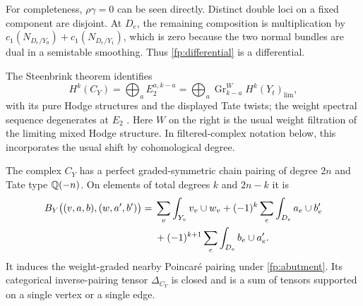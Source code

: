 For completeness, $\rho\gamma=0$ can be seen directly.  Distinct double loci
on a fixed component are disjoint.  At $D_e$, the remaining composition is
multiplication by
$c_1(N_{D_e/Y_0})+c_1(N_{D_e/Y_1})$, which is zero because the two normal
bundles are dual in a semistable smoothing.  Thus \eqref{fp:differential}
is a differential.

The Steenbrink theorem identifies
\begin{equation}\label{fp:abutment}
 H^k(C_Y)=\bigoplus_a E_2^{a,k-a}
 =\bigoplus_a\operatorname{Gr}^{W}_{k-a}H^k(Y_t)_{\mathrm{lim}},
\end{equation}
with its pure Hodge structures and the displayed Tate twists; the weight
spectral sequence degenerates at $E_2$
\cite{Steenbrink1976,Steenbrink1977}.
Here $W$ on the right is the usual weight filtration of the limiting mixed
Hodge structure.  In filtered-complex notation below, this incorporates the
usual shift by cohomological degree.

\begin{lemma}\label{fp:pairing}
The complex $C_Y$ has a perfect graded-symmetric chain pairing of degree $2n$
and Tate type $\mathbb Q(-n)$.  On elements of total degrees $k$ and $2n-k$ it is
\begin{align}\label{fp:pairing-formula}
 B_Y\bigl((v,a,b),(w,a',b')\bigr)
 ={}&\sum_v\int_{Y_v}v_v\cup w_v
       +(-1)^k\sum_e\int_{D_e}a_e\cup b'_e\\
    &+(-1)^{k+1}\sum_e\int_{D_e}b_e\cup a'_e.\notag
\end{align}
It induces the weight-graded nearby Poincar\'e pairing under
\eqref{fp:abutment}.  Its categorical inverse-pairing tensor $\Delta_{C_Y}$
is closed and is a sum of tensors supported on a single vertex or a single
edge.
\end{lemma}

